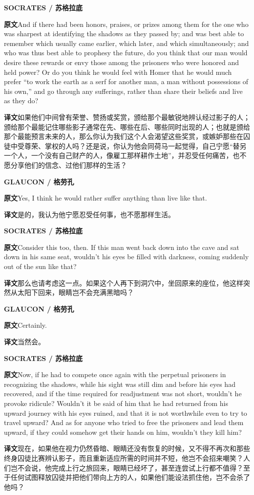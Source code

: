 \documentclass[UTF8,zihao=-4]{ctexart}
\newcommand{\BodyFont}{\fontsize{10.5pt}{15.5pt}\selectfont}
\newcommand{\origlabel}{\textbf{原文}\quad}
\newcommand{\translabel}{\textbf{译文}\quad}
\newenvironment{enblock}{\par\noindent\begingroup\BodyFont\origlabel}{\par\endgroup}
\newenvironment{zhblock}{\par\noindent\begingroup\BodyFont\translabel}{\par\endgroup\vspace{0.35em}}
\newcommand{\en}[1]{\begin{enblock}#1\end{enblock}}
\newcommand{\zh}[1]{\begin{zhblock}#1\end{zhblock}}
\newcommand{\speaker}[2]{\par\medskip\noindent\textbf{#1 / #2}\par}
\begin{document}
\speaker{SOCRATES}{苏格拉底}
\en{And if there had been honors, praises, or prizes among them for the one who was sharpest at identifying the shadows as they passed by; and was best able to remember which usually came earlier, which later, and which simultaneously; and who was thus best able to prophesy the future, do you think that our man would desire these rewards or envy those among the prisoners who were honored and held power? Or do you think he would feel with Homer that he would much prefer ``to work the earth as a serf for another man, a man without possessions of his own,'' and go through any sufferings, rather than share their beliefs and live as they do?}
\zh{如果他们中间曾有荣誉、赞扬或奖赏，颁给那个最敏锐地辨认经过影子的人；颁给那个最能记住哪些影子通常在先、哪些在后、哪些同时出现的人；也就是颁给那个最能预言未来的人，那么你认为我们这个人会渴望这些奖赏，或嫉妒那些在囚徒中受尊荣、掌权的人吗？还是说，你认为他会同荷马一起觉得，自己宁愿“替另一个人，一个没有自己财产的人，像雇工那样耕作土地”，并忍受任何痛苦，也不愿分享他们的信念、过他们那样的生活？}

\speaker{GLAUCON}{格劳孔}
\en{Yes, I think he would rather suffer anything than live like that.}
\zh{是的，我认为他宁愿忍受任何事，也不愿那样生活。}

\speaker{SOCRATES}{苏格拉底}
\en{Consider this too, then. If this man went back down into the cave and sat down in his same seat, wouldn't his eyes be filled with darkness, coming suddenly out of the sun like that?}
\zh{那么也请考虑这一点。如果这个人再下到洞穴中，坐回原来的座位，他这样突然从太阳下回来，眼睛岂不会充满黑暗吗？}

\speaker{GLAUCON}{格劳孔}
\en{Certainly.}
\zh{当然会。}

\speaker{SOCRATES}{苏格拉底}
\en{Now, if he had to compete once again with the perpetual prisoners in recognizing the shadows, while his sight was still dim and before his eyes had recovered, and if the time required for readjustment was not short, wouldn't he provoke ridicule? Wouldn't it be said of him that he had returned from his upward journey with his eyes ruined, and that it is not worthwhile even to try to travel upward? And as for anyone who tried to free the prisoners and lead them upward, if they could somehow get their hands on him, wouldn't they kill him?}
\zh{现在，如果他在视力仍然昏暗、眼睛还没有恢复的时候，又不得不再次和那些终身囚徒比赛辨认影子，而且重新适应所需的时间并不短，他岂不会招来嘲笑？人们岂不会说，他完成上行之旅回来，眼睛已经坏了，甚至连尝试上行都不值得？至于任何试图释放囚徒并把他们带向上方的人，如果他们能设法抓住他，岂不会杀了他吗？}
\end{document}
